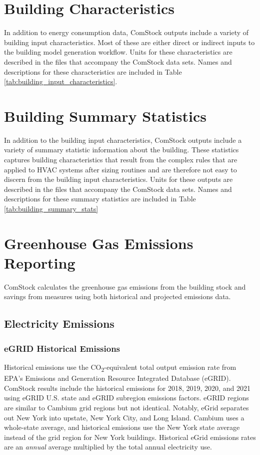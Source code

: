 \section{Building Characteristics}
In addition to energy consumption data, ComStock outputs include a variety of building input characteristics. Most of these are either direct or indirect inputs to the building model generation workflow. Units for these characteristics are described in the files that accompany the ComStock data sets. Names and descriptions for these characteristics are included in Table \ref{tab:building_input_characteristics}.


\pagebreak
\section{Building Summary Statistics}
In addition to the building input characteristics, ComStock outputs include a variety of summary statistic information about the building.  These statistics captures building characteristics that result from the complex rules that are applied to HVAC systems after sizing routines and are therefore not easy to discern from the building input characteristics. Units for these outputs are described in the files that accompany the ComStock data sets. Names and descriptions for these summary statistics are included in Table \ref{tab:building_summary_stats}

\section{Greenhouse Gas Emissions Reporting}
ComStock calculates the greenhouse gas emissions from the building stock and savings from measures using both historical and projected emissions data.

\subsection{Electricity Emissions}
\subsubsection{eGRID Historical Emissions}
Historical emissions use the CO\textsubscript{2}-equivalent total output emission rate from EPA's Emissions and Generation Resource Integrated Database (eGRID)\citep{egrid2020}. ComStock results include the historical emissions for 2018, 2019, 2020, and 2021 using eGRID U.S. state and eGRID subregion emissions factors. eGRID regions are similar to Cambium grid regions but not identical. Notably, eGrid separates out New York into upstate, New York City, and Long Island. Cambium uses a whole-state average, and historical emissions use the New York state average instead of the grid region for New York buildings. Historical eGrid emissions rates are an \textit{annual} average multiplied by the total annual electricity use.

